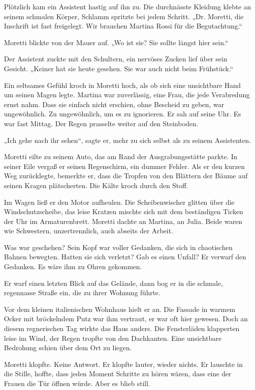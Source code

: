 \documentclass[
]{article}
\begin{document}
Plötzlich kam ein Assistent hastig auf ihn zu. Die durchnässte Kleidung klebte an seinem schmalen Körper, Schlamm spritzte bei jedem Schritt. „Dr. Moretti, die Inschrift ist fast freigelegt. Wir brauchen Martina Rossi für die Begutachtung.``

Moretti blickte von der Mauer auf. „Wo ist sie? Sie sollte längst hier sein.``

Der Assistent zuckte mit den Schultern, ein nervöses Zucken lief über sein Gesicht. „Keiner hat sie heute gesehen. Sie war auch nicht beim Frühstück.``

Ein seltsames Gefühl kroch in Moretti hoch, als ob sich eine unsichtbare Hand um seinen Magen legte. Martina war zuverlässig, eine Frau, die jede Verabredung ernst nahm. Dass sie einfach nicht erschien, ohne Bescheid zu geben, war ungewöhnlich. Zu ungewöhnlich, um es zu ignorieren. Er sah auf seine Uhr. Es war fast Mittag. Der Regen prasselte weiter auf den Steinboden.

„Ich gehe nach ihr sehen``, sagte er, mehr zu sich selbst als zu seinem Assistenten.

Moretti eilte zu seinem Auto, das am Rand der Ausgrabungsstätte parkte. In seiner Eile vergaß er seinen Regenschirm, ein dummer Fehler. Als er den kurzen Weg zurücklegte, bemerkte er, dass die Tropfen von den Blättern der Bäume auf seinen Kragen plätscherten. Die Kälte kroch durch den Stoff.

Im Wagen ließ er den Motor aufheulen. Die Scheibenwischer glitten über die Windschutzscheibe, das leise Kratzen mischte sich mit dem beständigen Ticken der Uhr im Armaturenbrett. Moretti dachte an Martina, an Julia. Beide waren wie Schwestern, unzertrennlich, auch abseits der Arbeit.

Was war geschehen? Sein Kopf war voller Gedanken, die sich in chaotischen Bahnen bewegten. Hatten sie sich verletzt? Gab es einen Unfall? Er verwarf den Gedanken. Es wäre ihm zu Ohren gekommen.

Er warf einen letzten Blick auf das Gelände, dann bog er in die schmale, regennasse Straße ein, die zu ihrer Wohnung führte.

Vor dem kleinen italienischen Wohnhaus hielt er an. Die Fassade in warmem Ocker mit bröckelndem Putz war ihm vertraut, er war oft hier gewesen. Doch an diesem regnerischen Tag wirkte das Haus anders. Die Fensterläden klapperten leise im Wind, der Regen tropfte von den Dachkanten. Eine unsichtbare Bedrohung schien über dem Ort zu liegen.

Moretti klopfte. Keine Antwort. Er klopfte lauter, wieder nichts. Er lauschte in die Stille, hoffte, dass jeden Moment Schritte zu hören wären, dass eine der Frauen die Tür öffnen würde. Aber es blieb still.
\end{document}
